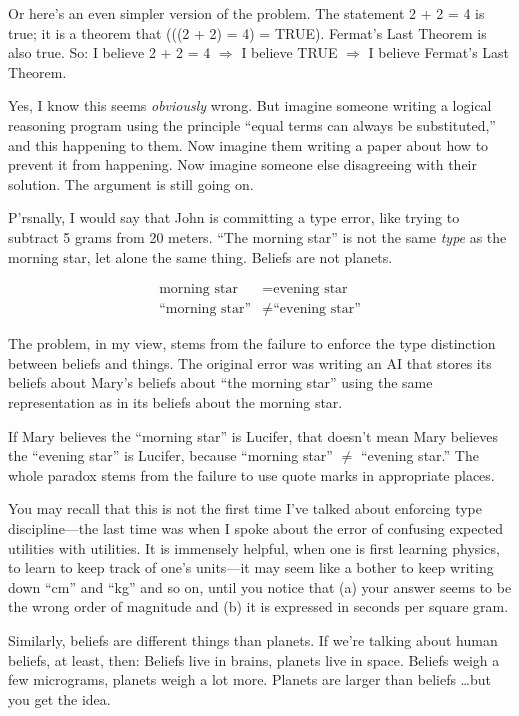 {
 Or here's an even simpler version of the problem.
The statement 2 + 2 = 4 is true; it is a theorem that (((2 + 2) = 4) =
TRUE). Fermat's Last Theorem is also true. So: I
believe 2 + 2 = 4 $\Rightarrow $ I believe TRUE $\Rightarrow $ I
believe Fermat's Last Theorem.}

{
 Yes, I know this seems \textit{obviously} wrong. But imagine
someone writing a logical reasoning program using the principle
``equal terms can always be
substituted,'' and this happening to them. Now
imagine them writing a paper about how to prevent it from happening.
Now imagine someone else disagreeing with their solution. The argument
is still going on.}

{
 P'rsnally, I would say that John is committing a
type error, like trying to subtract 5 grams from 20 meters.
``The morning star'' is not the same
\textit{type} as the morning star, let alone the same thing. Beliefs
are not planets.}

\begin{align*}
\text{morning star} &= \text{evening star}\\
\text{``morning star''} &\neq \text{``evening star''}
\end{align*}

{
 The problem, in my view, stems from the failure to enforce the
type distinction between beliefs and things. The original error was
writing an AI that stores its beliefs about Mary's
beliefs about ``the morning star''
using the same representation as in its beliefs about the morning
star.}

{
 If Mary believes the ``morning
star'' is Lucifer, that doesn't mean
Mary believes the ``evening star''
is Lucifer, because ``morning star''
${\neq}$ ``evening star.'' The whole
paradox stems from the failure to use quote marks in appropriate
places.}

{
 You may recall that this is not the first time
I've talked about enforcing type discipline---the last
time was when I spoke about the error of confusing expected utilities
with utilities. It is immensely helpful, when one is first learning
physics, to learn to keep track of one's units---it may
seem like a bother to keep writing down
``cm'' and
``kg'' and so on, until you notice
that (a) your answer seems to be the wrong order of magnitude and (b)
it is expressed in seconds per square gram.}

{
 Similarly, beliefs are different things than planets. If
we're talking about human beliefs, at least, then:
Beliefs live in brains, planets live in space. Beliefs weigh a few
micrograms, planets weigh a lot more. Planets are larger than beliefs
\ldots but you get the idea.}


